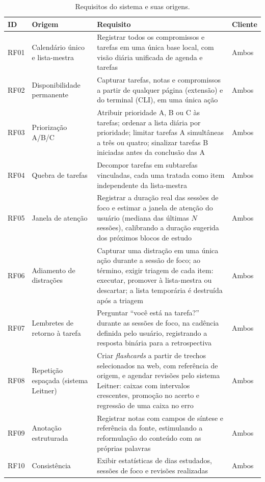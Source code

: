 \documentclass[12pt, %
openright, 
oneside,
a4paper,
english,   %
brazil]{facom-ufu-abntex2}
\begin{document}
\begin{table}[htbp]
\centering
\caption{Requisitos do sistema e suas origens.}
\label{tab:requisitos}
\footnotesize
\begin{tabular}{p{1.2cm}p{3.4cm}p{6.6cm}p{2.2cm}}
\hline
\textbf{ID} & \textbf{Origem} & \textbf{Requisito} & \textbf{Cliente} \\
\hline
RF01 & Calendário único e lista-mestra & Registrar todos os compromissos e tarefas em uma única base local, com visão diária unificada de agenda e tarefas & Ambos \\
RF02 & Disponibilidade permanente & Capturar tarefas, notas e compromissos a partir de qualquer página (extensão) e do terminal (CLI), em uma única ação & Ambos \\
RF03 & Priorização A/B/C & Atribuir prioridade A, B ou C às tarefas; ordenar a lista diária por prioridade; limitar tarefas A simultâneas a três ou quatro; sinalizar tarefas B iniciadas antes da conclusão das A & Ambos \\
RF04 & Quebra de tarefas & Decompor tarefas em subtarefas vinculadas, cada uma tratada como item independente da lista-mestra & Ambos \\
RF05 & Janela de atenção & Registrar a duração real das sessões de foco e estimar a janela de atenção do usuário (mediana das últimas $N$ sessões), calibrando a duração sugerida dos próximos blocos de estudo & Ambos \\
RF06 & Adiamento de distrações & Capturar uma distração em uma única ação durante a sessão de foco; ao término, exigir triagem de cada item: executar, promover à lista-mestra ou descartar; a lista temporária é destruída após a triagem & Ambos \\
RF07 & Lembretes de retorno à tarefa & Perguntar ``você está na tarefa?'' durante as sessões de foco, na cadência definida pelo usuário, registrando a resposta binária para a retrospectiva & Ambos \\
RF08 & Repetição espaçada (sistema Leitner) & Criar \textit{flashcards} a partir de trechos selecionados na web, com referência de origem, e agendar revisões pelo sistema Leitner: caixas com intervalos crescentes, promoção no acerto e regressão de uma caixa no erro & Ambos \\
RF09 & Anotação estruturada & Registrar notas com campos de síntese e referência da fonte, estimulando a reformulação do conteúdo com as próprias palavras & Ambos \\
RF10 & Consistência & Exibir estatísticas de dias estudados, sessões de foco e revisões realizadas & Ambos \\

\end{tabular}
\end{table}
\end{document}
